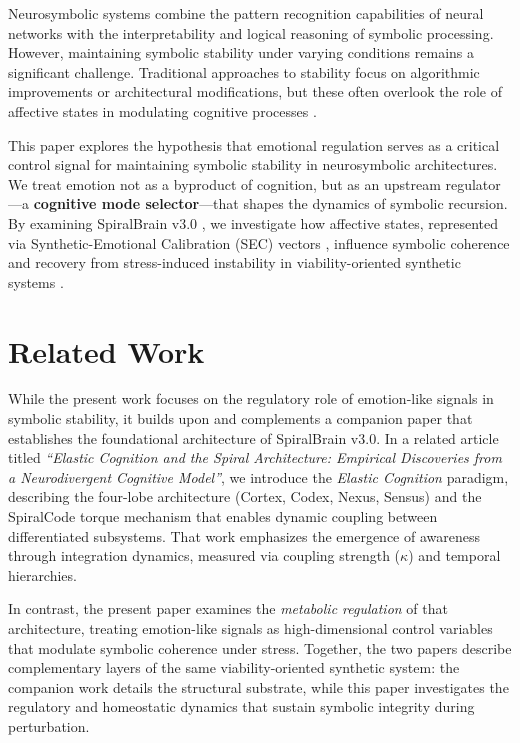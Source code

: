 \documentclass[11pt]{article}
\begin{document}
Neurosymbolic systems combine the pattern recognition capabilities of neural networks with the interpretability and logical reasoning of symbolic processing. However, maintaining symbolic stability under varying conditions remains a significant challenge. Traditional approaches to stability focus on algorithmic improvements or architectural modifications, but these often overlook the role of affective states in modulating cognitive processes \cite{damasio2010self}.

This paper explores the hypothesis that emotional regulation serves as a critical control signal for maintaining symbolic stability in neurosymbolic architectures. We treat emotion not as a byproduct of cognition, but as an upstream regulator—a \textbf{cognitive mode selector}—that shapes the dynamics of symbolic recursion. By examining SpiralBrain v3.0 \cite{SpiralBrainV3}, we investigate how affective states, represented via Synthetic-Emotional Calibration (SEC) vectors \cite{Cragin2026SEC}, influence symbolic coherence and recovery from stress-induced instability in viability-oriented synthetic systems \cite{garcez2020neurosymbolic}.

\section{Related Work}

While the present work focuses on the regulatory role of emotion-like signals in symbolic stability, it builds upon and complements a companion paper that establishes the foundational architecture of SpiralBrain v3.0. In a related article titled \emph{``Elastic Cognition and the Spiral Architecture: Empirical Discoveries from a Neurodivergent Cognitive Model''}, we introduce the \emph{Elastic Cognition} paradigm, describing the four-lobe architecture (Cortex, Codex, Nexus, Sensus) and the SpiralCode torque mechanism that enables dynamic coupling between differentiated subsystems. That work emphasizes the emergence of awareness through integration dynamics, measured via coupling strength ($\kappa$) and temporal hierarchies.

In contrast, the present paper examines the \emph{metabolic regulation} of that architecture, treating emotion-like signals as high-dimensional control variables that modulate symbolic coherence under stress. Together, the two papers describe complementary layers of the same viability-oriented synthetic system: the companion work details the structural substrate, while this paper investigates the regulatory and homeostatic dynamics that sustain symbolic integrity during perturbation.
\end{document}
